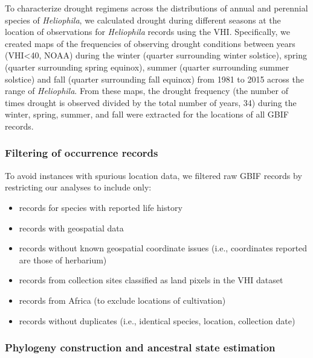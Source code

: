 \documentclass[man,floatsintext]{apa6}
\providecommand{\tightlist}{%
  \setlength{\itemsep}{0pt}\setlength{\parskip}{0pt}}
\theoremstyle{definition}
\theoremstyle{definition}
\theoremstyle{definition}
\theoremstyle{remark}
\begin{document}
To characterize drought regimens across the distributions of annual and
perennial species of \emph{Heliophila}, we calculated drought during
different seasons at the location of observations for \emph{Heliophila}
records using the VHI. Specifically, we created maps of the frequencies
of observing drought conditions between years (VHI\textless{}40, NOAA)
during the winter (quarter surrounding winter solstice), spring (quarter
surrounding spring equinox), summer (quarter surrounding summer
solstice) and fall (quarter surrounding fall equinox) from 1981 to 2015
across the range of \emph{Heliophila}. From these maps, the drought
frequency (the number of times drought is observed divided by the total
number of years, 34) during the winter, spring, summer, and fall were
extracted for the locations of all GBIF records.

\hypertarget{filtering-of-occurrence-records}{%
\subsubsection{Filtering of occurrence
records}\label{filtering-of-occurrence-records}}

To avoid instances with spurious location data, we filtered raw GBIF
records by restricting our analyses to include only:

\begin{itemize}
\tightlist
\item
  records for species with reported life history\\
\item
  records with geospatial data\\
\item
  records without known geospatial coordinate issues (i.e., coordinates
  reported are those of herbarium)\\
\item
  records from collection sites classified as land pixels in the VHI
  dataset\\
\item
  records from Africa (to exclude locations of cultivation)
\item
  records without duplicates (i.e., identical species, location,
  collection date)
\end{itemize}

\hypertarget{phylogeny-construction-and-ancestral-state-estimation}{%
\subsubsection{Phylogeny construction and ancestral state
estimation}\label{phylogeny-construction-and-ancestral-state-estimation}}
\end{document}
